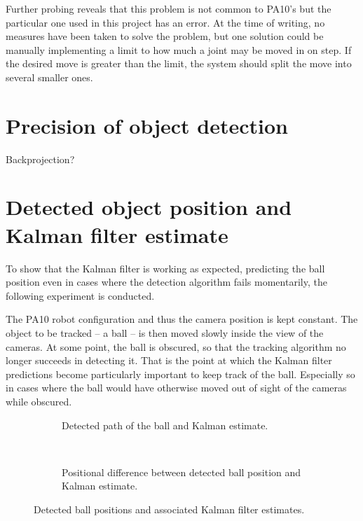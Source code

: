 Further probing reveals that this problem is not common to PA10's but the particular one used in this project has an error.
At the time of writing, no measures have been taken to solve the problem, but one solution could be manually implementing a limit to how much a joint may be moved in on step.
If the desired move is greater than the limit, the system should split the move into several smaller ones.





\section{Precision of object detection}
Backprojection?


\section{Detected object position and Kalman filter estimate}
To show that the Kalman filter is working as expected, predicting the ball position even in cases where the detection algorithm fails momentarily, the following experiment is conducted.

The PA10 robot configuration and thus the camera position is kept constant.
The object to be tracked -- a ball -- is then moved slowly inside the view of the cameras.
At some point, the ball is obscured, so that the tracking algorithm no longer succeeds in detecting it.
That is the point at which the Kalman filter predictions become particularly important to keep track of the ball.
Especially so in cases where the ball would have otherwise moved out of sight of the cameras while obscured.

\begin{figure}[htb]
    \centering
    \begin{subfigure}[b]{0.49\textwidth}
        \resizebox{\columnwidth}{!}{%
            
        }
        \caption{Detected path of the ball and Kalman estimate.}
        \label{fig:ball_kalman_3d}
    \end{subfigure}~
    \begin{subfigure}[b]{0.49\textwidth}
        \resizebox{\columnwidth}{!}{%
            
        }
        \caption{Positional difference between detected ball position and Kalman estimate.}
        \label{fig:ball_kalman_error}
    \end{subfigure}
    \caption{Detected ball positions and associated Kalman filter estimates.}
    \label{fig:kalman_test}
\end{figure}

